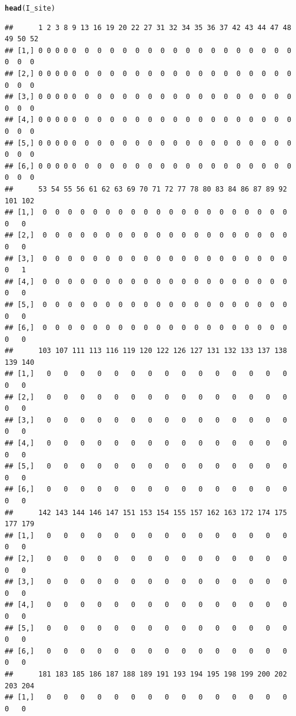 \documentclass{article}\usepackage[]{graphicx}\usepackage[]{color}
\makeatletter
\newcommand{\hlstd}[1]{\textcolor[rgb]{0.345,0.345,0.345}{#1}}%
\newcommand{\hlkwd}[1]{\textcolor[rgb]{0.737,0.353,0.396}{\textbf{#1}}}%
\newenvironment{kframe}{%
 \def\at@end@of@kframe{}%
 \ifinner\ifhmode%
  \def\at@end@of@kframe{\end{minipage}}%
  \begin{minipage}{\columnwidth}%
 \fi\fi%
 \def\FrameCommand##1{\hskip\@totalleftmargin \hskip-\fboxsep
 \colorbox{shadecolor}{##1}\hskip-\fboxsep
     \hskip-\linewidth \hskip-\@totalleftmargin \hskip\columnwidth}%
 \MakeFramed {\advance\hsize-\width
   \@totalleftmargin\z@ \linewidth\hsize
   \@setminipage}}%
 {\par\unskip\endMakeFramed%
 \at@end@of@kframe}
\newenvironment{knitrout}{}{} %
\makeatother
\begin{document}
\begin{knitrout}
\color{fgcolor}\begin{kframe}
\begin{alltt}
\hlkwd{head}\hlstd{(I_site)}
\end{alltt}
\begin{verbatim}
##      1 2 3 8 9 13 16 19 20 22 27 31 32 34 35 36 37 42 43 44 47 48 49 50 52
## [1,] 0 0 0 0 0  0  0  0  0  0  0  0  0  0  0  0  0  0  0  0  0  0  0  0  0
## [2,] 0 0 0 0 0  0  0  0  0  0  0  0  0  0  0  0  0  0  0  0  0  0  0  0  0
## [3,] 0 0 0 0 0  0  0  0  0  0  0  0  0  0  0  0  0  0  0  0  0  0  0  0  0
## [4,] 0 0 0 0 0  0  0  0  0  0  0  0  0  0  0  0  0  0  0  0  0  0  0  0  0
## [5,] 0 0 0 0 0  0  0  0  0  0  0  0  0  0  0  0  0  0  0  0  0  0  0  0  0
## [6,] 0 0 0 0 0  0  0  0  0  0  0  0  0  0  0  0  0  0  0  0  0  0  0  0  0
##      53 54 55 56 61 62 63 69 70 71 72 77 78 80 83 84 86 87 89 92 101 102
## [1,]  0  0  0  0  0  0  0  0  0  0  0  0  0  0  0  0  0  0  0  0   0   0
## [2,]  0  0  0  0  0  0  0  0  0  0  0  0  0  0  0  0  0  0  0  0   0   0
## [3,]  0  0  0  0  0  0  0  0  0  0  0  0  0  0  0  0  0  0  0  0   0   1
## [4,]  0  0  0  0  0  0  0  0  0  0  0  0  0  0  0  0  0  0  0  0   0   0
## [5,]  0  0  0  0  0  0  0  0  0  0  0  0  0  0  0  0  0  0  0  0   0   0
## [6,]  0  0  0  0  0  0  0  0  0  0  0  0  0  0  0  0  0  0  0  0   0   0
##      103 107 111 113 116 119 120 122 126 127 131 132 133 137 138 139 140
## [1,]   0   0   0   0   0   0   0   0   0   0   0   0   0   0   0   0   0
## [2,]   0   0   0   0   0   0   0   0   0   0   0   0   0   0   0   0   0
## [3,]   0   0   0   0   0   0   0   0   0   0   0   0   0   0   0   0   0
## [4,]   0   0   0   0   0   0   0   0   0   0   0   0   0   0   0   0   0
## [5,]   0   0   0   0   0   0   0   0   0   0   0   0   0   0   0   0   0
## [6,]   0   0   0   0   0   0   0   0   0   0   0   0   0   0   0   0   0
##      142 143 144 146 147 151 153 154 155 157 162 163 172 174 175 177 179
## [1,]   0   0   0   0   0   0   0   0   0   0   0   0   0   0   0   0   0
## [2,]   0   0   0   0   0   0   0   0   0   0   0   0   0   0   0   0   0
## [3,]   0   0   0   0   0   0   0   0   0   0   0   0   0   0   0   0   0
## [4,]   0   0   0   0   0   0   0   0   0   0   0   0   0   0   0   0   0
## [5,]   0   0   0   0   0   0   0   0   0   0   0   0   0   0   0   0   0
## [6,]   0   0   0   0   0   0   0   0   0   0   0   0   0   0   0   0   0
##      181 183 185 186 187 188 189 191 193 194 195 198 199 200 202 203 204
## [1,]   0   0   0   0   0   0   0   0   0   0   0   0   0   0   0   0   0

\end{verbatim}
\end{kframe}
\end{knitrout}
\end{document}
